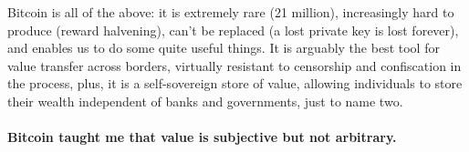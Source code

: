 Bitcoin is all of the above: it is extremely rare (21 million),
increasingly hard to produce (reward halvening), can't be replaced (a
lost private key is lost forever), and enables us to do some quite
useful things. It is arguably the best tool for value transfer across
borders, virtually resistant to censorship and confiscation in the
process, plus, it is a self-sovereign store of value, allowing
individuals to store their wealth independent of banks and governments,
just to name two.

\paragraph{Bitcoin taught me that value is subjective but not arbitrary.}

%
%
%
%
